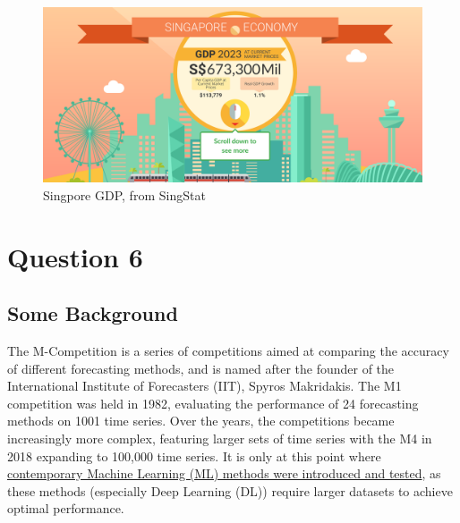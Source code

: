 \documentclass[12pt]{article}
\begin{document}
\begin{figure}[H]
    \centering
    \includegraphics[width=\textwidth]{Images/singaporegdp2.png}
    \caption{Singpore GDP, from SingStat}
    \label{fig:5-sggdp2}
\end{figure} 

\newpage 

\section*{Question 6}





\subsection*{Some Background}

The M-Competition is a series of competitions aimed at comparing the accuracy of different forecasting methods, and is named after the founder of the International Institute of Forecasters (IIT), Spyros Makridakis. The M1 competition was held in 1982, evaluating the performance of 24 forecasting methods on 1001 time series. Over the years, the competitions became increasingly more complex, featuring larger sets of time series with the M4 in 2018 expanding to 100,000 time series. It is only at this point where \href{https://www.unic.ac.cy/iff/research/forecasting/m-competitions/m5/}{contemporary Machine Learning (ML) methods were introduced and tested}, as these methods (especially Deep Learning (DL)) require larger datasets to achieve optimal performance. \\ 
\end{document}
